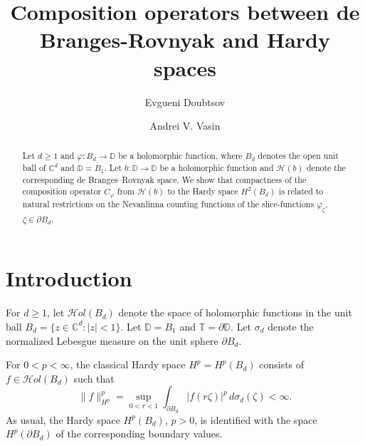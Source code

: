 \documentclass{amsart}
\numberwithin{equation}{section}
\theoremstyle{definition}
\newcommand{\bd}{{B_d}}
\newcommand{\meal}{\sigma_d}
\newcommand{\za}{\zeta}
\newcommand{\hol}{\mathcal{H}ol}
\newcommand{\Dbb}{\mathbb D}
\newcommand{\Tbb}{\mathbb T}
\newcommand{\Cbb}{\mathbb C}
\newcommand{\spd}{\partial B_d}
\begin{document}
\title[Composition operators]{Composition operators between de Branges-Rovnyak and Hardy spaces}
\author{Evgueni Doubtsov}
\address{St.~Petersburg Department
of Steklov Mathematical Institute, Fontanka 27, St.~Petersburg 191023, Russia}

\author{Andrei V. Vasin}
\address{Admiral Makarov State University of Maritime and Inland Shipping,
Dvinskaya st.~5/7, St.~Petersburg 198035, Russia}




\begin{abstract}
Let $d\ge 1$ and $\varphi: B_d\to\mathbb{D}$ be a holomorphic function,
where $B_d$ denotes the open unit ball of $\mathbb{C}^d$ and $\mathbb{D} = B_1$.
Let $b: \mathbb{D} \to \mathbb{D}$ be a holomorphic function and
$\mathcal {H}(b)$  denote the corresponding de Branges--Rovnyak space.
We show that compactness of the composition operator $C_\varphi$
from $\mathcal {H}(b)$ to the Hardy space $H^2(B_d)$
is related to natural restrictions on the Nevanlinna counting functions
of the slice-functions $\varphi_\zeta$, $\zeta\in \partial B_d$.
\end{abstract}

\maketitle

\section{Introduction}
For $d\ge 1$, let $\hol(\bd)$ denote the space of holomorphic functions in the unit ball
$\bd = \{z\in\Cbb^d: |z|<1\}$.
Let $\Dbb = B_1$ and $\Tbb = \partial \Dbb$.
Let $\meal$ denote the normalized Lebesgue measure on the unit sphere $\spd$.

For $0<p<\infty$, the classical Hardy space $H^p=H^p(\bd)$ consists of
$f\in \hol(\bd)$ such that
\[
\|f\|_{H^p}^p = \sup_{0<r<1} \int_{\spd} |f(r\za)|^p\, d\meal(\za) < \infty.
\]
As usual, the Hardy space $H^p(\bd)$, $p>0$, is identified with the space
$H^p(\spd)$ of the corresponding boundary values. 
\end{document}
